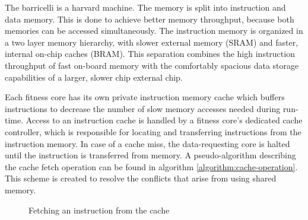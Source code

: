The \Gls{barricelli} is a \Gls{harvard machine}. 
The memory is split into instruction and data memory. 
This is done to achieve better memory throughput, because both memories can be accessed simultaneously.
The instruction memory is organized in a two layer memory hierarchy, with slower external memory (\gls{SRAM}) and faster, internal on-chip caches (\gls{BRAM}).
This separation combines the high instruction throughput of fast on-board memory with the comfortably spacious data storage capabilities of a larger, slower chip external chip.

Each fitness core has its own private instruction memory cache which buffers instructions to decrease the number of slow memory accesses needed during run-time.
Access to an instruction cache is handled by a fitness core's dedicated cache controller, which is responsible for locating and transferring instructions from the instruction memory.
In case of a cache miss, the data-requesting core is halted until the instruction is transferred from memory.
A pseudo-algorithm describing the cache fetch operation can be found in algorithm \vref{algorithm:cache-operation}.
This scheme is created to resolve the conflicts that arise from using shared memory. 

\begin{figure}[H]
\begin{algorithm}[H]
\SetAlgoLined
\DontPrintSemicolon
{}
\Begin{
    \If{$ a = Ca[A \bmod{512}] $}{
        \Return{$ Ci[A \bmod{512}] $}
    }\Else{
        $ Caa \bmod{512}] \longleftarrow a $\;
        $ Ci[a \bmod{512}] \longleftarrow M[a] $\;
        \Return{$ Ci[A \bmod{512}] $}
    }
}
\caption{Fetching an instruction from the cache}
\label{algorithm:cache-operation}
\end{algorithm}
\end{figure}
